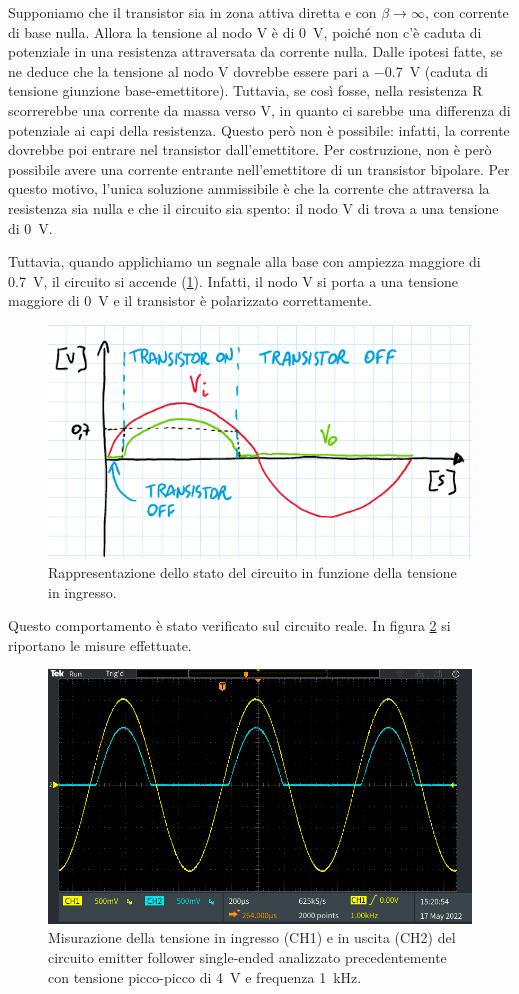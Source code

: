 Supponiamo che il transistor sia in zona attiva diretta e con $\beta\to\infty$, con corrente di base nulla. Allora la tensione al nodo V è di \SI{0}{\volt}, poiché non c'è caduta di potenziale in una resistenza attraversata da corrente nulla. Dalle ipotesi fatte, se ne deduce che la tensione al nodo V dovrebbe essere pari a \SI{-0.7}{\volt} (caduta di tensione giunzione base-emettitore). Tuttavia, se così fosse, nella resistenza R scorrerebbe una corrente da massa verso V, in quanto ci sarebbe una differenza di potenziale ai capi della resistenza. Questo però non è possibile: infatti, la corrente dovrebbe poi entrare nel transistor dall'emettitore. Per costruzione, non è però possibile avere una corrente entrante nell'emettitore di un transistor bipolare. Per questo motivo, l'unica soluzione ammissibile è che la corrente che attraversa la resistenza sia nulla e che il circuito sia spento: il nodo V di trova a una tensione di \SI{0}{\volt}. 

Tuttavia, quando applichiamo un segnale alla base con ampiezza maggiore di \SI{0.7}{\volt}, il circuito si accende (\Fig\ref{fig:emitterfollwer_se_statocircuito}). Infatti, il nodo V si porta a una tensione maggiore di \SI{0}{\volt} e il transistor è polarizzato correttamente.
\begin{figure}[h!]
	\centering
	\includegraphics[width=0.7\linewidth]{./ImageFiles/Laboratorio 2/emitter follower errore soglia}
	\caption{Rappresentazione dello stato del circuito in funzione della tensione in ingresso.}
	\label{fig:emitterfollwer_se_statocircuito}
\end{figure}

Questo comportamento è stato verificato sul circuito reale. In figura \ref{fig:emitterfollwer_se_errore} si riportano le misure effettuate.
\begin{figure}[h!]
	\centering
	\includegraphics[width=0.7\linewidth]{./ImageFiles/Laboratorio 2/TEK00020}
	\caption{Misurazione della tensione in ingresso (CH1) e in uscita (CH2) del circuito emitter follower single-ended analizzato precedentemente con tensione picco-picco di \SI{4}{\volt} e frequenza \SI{1}{\kilo\hertz}.}
	\label{fig:emitterfollwer_se_errore}
\end{figure}
